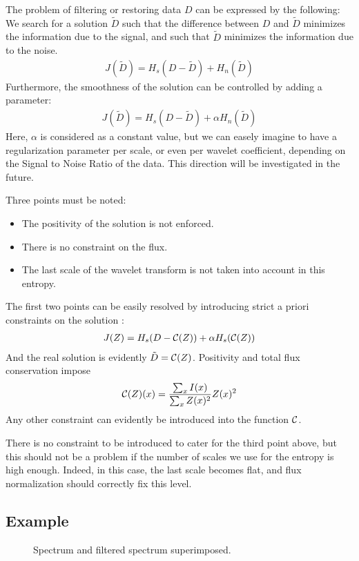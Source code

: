 \documentclass[11pt,a4paper]{article}
\begin{document}
The problem of filtering or restoring data $D$ can be expressed by the 
following: 
We search for a solution $\tilde D$ such that the difference between
$D$ and $\tilde D$ minimizes the information due to the signal, and 
such that  $\tilde D$ minimizes the information due to the noise. 
\begin{eqnarray}
J(\tilde D) = H_s(D-\tilde D) + H_n(\tilde D)
\label{eqn_func1}
\end{eqnarray}
Furthermore, the smoothness of the solution can be controlled by adding
a parameter:
\begin{eqnarray}
J(\tilde D) = H_s(D-\tilde D) + \alpha H_n(\tilde D)
\label{eqn_func2}
\end{eqnarray}
Here, $\alpha$ is considered as a constant value, but we can easely 
imagine to have a regularization parameter per scale, or even per wavelet
coefficient, depending on the Signal to Noise Ratio of the data. This
direction will be investigated in the future.
   
Three points must be noted:
\begin{itemize}
\item The positivity of the solution is not enforced.
\item There is no constraint on the flux.
\item The last scale of the wavelet transform is not taken into 
account in this entropy.
\end{itemize}
The first two points can be easily resolved by introducing strict a priori
 constraints on the solution \cite{thiebault95}:
\begin{eqnarray}
J(Z) = H_s(D-{\cal C}(Z)) + \alpha H_s({\cal C}(Z))
\end{eqnarray}
And the real solution is evidently $\tilde D = {\cal C}(Z)$. 
Positivity and total flux conservation impose
\begin{eqnarray}
{\cal C}(Z)(x) = \frac{\sum_x I(x)}{\sum_x Z(x)^2} Z(x)^2
\end{eqnarray}
Any other constraint can evidently be introduced into the function ${\cal C}$.

There is no constraint to be introduced to cater for the third point above, 
but this should not be a problem
if the number of scales we use for the entropy is high enough. Indeed, in
this case, the last scale becomes flat, and flux normalization should 
correctly fix this level.

\subsection{Example}
\begin{figure}[htb]
\centerline{
\vbox{
}}
\caption{Spectrum and filtered spectrum superimposed.}
\label{fig_lit6_mem1}
\end{figure}
\end{document}
